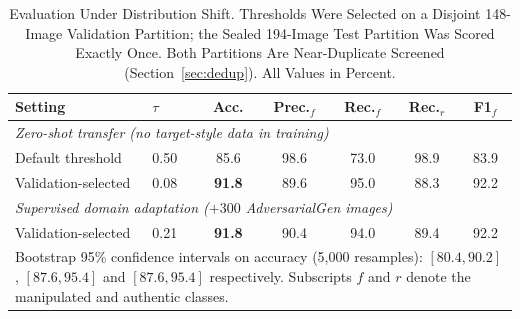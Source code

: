 \documentclass[conference,a4paper]{IEEEtran}
\begin{document}
\begin{table}[!tb]
\caption{Evaluation Under Distribution Shift. Thresholds Were Selected on a
Disjoint 148-Image Validation Partition; the Sealed 194-Image Test Partition
Was Scored Exactly Once. Both Partitions Are Near-Duplicate Screened
(Section~\ref{sec:dedup}). All Values in Percent.}
\label{tab:shift}
\centering
\setlength{\tabcolsep}{3pt}
\begin{tabular}{llccccc}
\toprule
\textbf{Setting} & \textbf{$\tau$} & \textbf{Acc.} & \textbf{Prec.$_{f}$} &
\textbf{Rec.$_{f}$} & \textbf{Rec.$_{r}$} & \textbf{F1$_{f}$} \\
\midrule
\multicolumn{7}{l}{\emph{Zero-shot transfer (no target-style data in training)}} \\
Default threshold   & 0.50 & 85.6 & 98.6 & 73.0 & 98.9 & 83.9 \\
Validation-selected & 0.08 & \textbf{91.8} & 89.6 & 95.0 & 88.3 & 92.2 \\
\midrule
\multicolumn{7}{l}{\emph{Supervised domain adaptation ($+300$ AdversarialGen images)}} \\
Validation-selected & 0.21 & \textbf{91.8} & 90.4 & 94.0 & 89.4 & 92.2 \\
\bottomrule
\multicolumn{7}{p{0.95\columnwidth}}{\footnotesize Bootstrap 95\% confidence
intervals on accuracy (5{,}000 resamples): $[80.4, 90.2]$, $[87.6, 95.4]$ and
$[87.6, 95.4]$ respectively. Subscripts $f$ and $r$ denote the manipulated and
authentic classes.}
\end{tabular}
\end{table}
\end{document}
